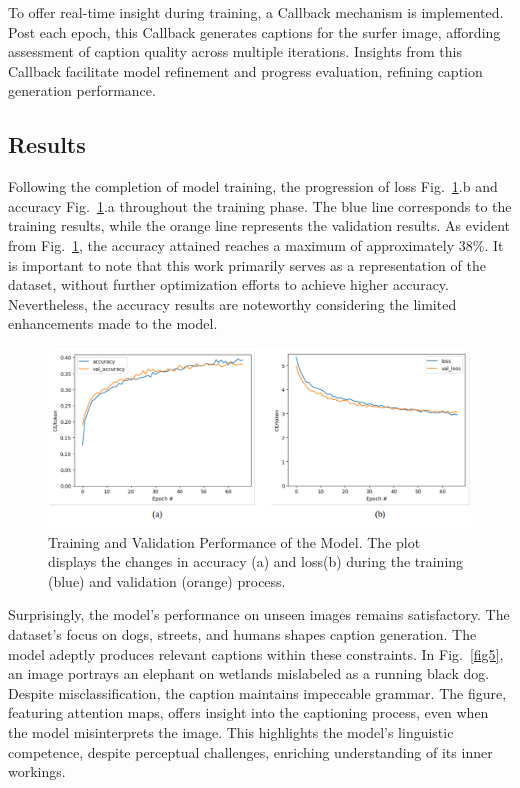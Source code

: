\documentclass[runningheads]{llncs}
\begin{document}
To offer real-time insight during training, a Callback mechanism is implemented. Post each epoch, this Callback generates captions for the surfer image, affording assessment of caption quality across multiple iterations. Insights from this Callback facilitate model refinement and progress evaluation, refining caption generation performance.

\subsection{Results}

Following the completion of model training, the progression of loss Fig.~\ref{fig4}.b and accuracy  Fig.~\ref{fig4}.a throughout the training phase. The blue line corresponds to the training results, while the orange line represents the validation results.
As evident from Fig.~\ref{fig4}, the accuracy attained reaches a maximum of approximately 38\%. It is important to note that this work primarily serves as a representation of the dataset, without further optimization efforts to achieve higher accuracy. Nevertheless, the accuracy results are noteworthy considering the limited enhancements made to the model.

\begin{figure}
  \includegraphics[width=\textwidth]{loss.png}
  \caption{Training and Validation Performance of the Model. The plot displays the changes in accuracy (a) and loss(b) during the training (blue) and validation (orange) process.} \label{fig4}
\end{figure}

Surprisingly, the model's performance on unseen images remains satisfactory. The dataset's focus on dogs, streets, and humans shapes caption generation. The model adeptly produces relevant captions within these constraints. In Fig.~\ref{fig5}, an image portrays an elephant on wetlands mislabeled as a running black dog. Despite misclassification, the caption maintains impeccable grammar. The figure, featuring attention maps, offers insight into the captioning process, even when the model misinterprets the image. This highlights the model's linguistic competence, despite perceptual challenges, enriching understanding of its inner workings.
\end{document}
